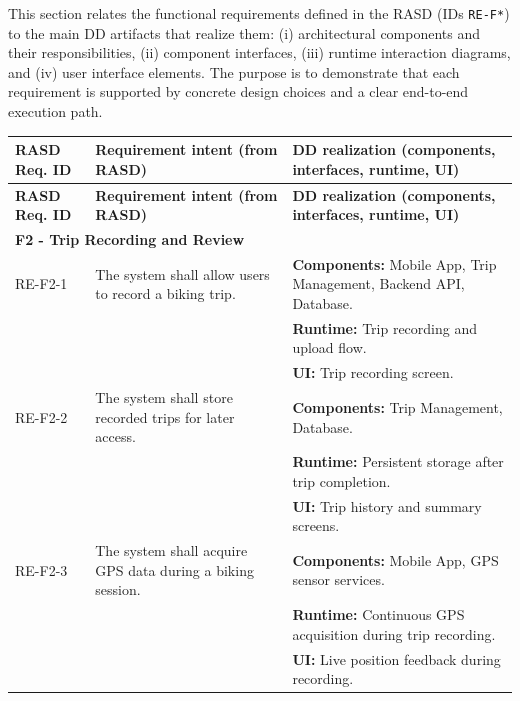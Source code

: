 
This section relates the functional requirements defined in the RASD (IDs \texttt{RE-F*})
to the main DD artifacts that realize them: (i) architectural components and their responsibilities,
(ii) component interfaces, (iii) runtime interaction diagrams, and (iv) user interface elements.
The purpose is to demonstrate that each requirement is supported by concrete design choices and
a clear end-to-end execution path.

\renewcommand{\arraystretch}{1.25}
\small
\begin{longtable}{|p{2.4cm}|p{5.2cm}|p{7cm}|}
\hline
\textbf{RASD Req. ID} & \textbf{Requirement intent (from RASD)} & \textbf{DD realization (components, interfaces, runtime, UI)} \\
\hline
\endfirsthead

\hline
\textbf{RASD Req. ID} & \textbf{Requirement intent (from RASD)} & \textbf{DD realization (components, interfaces, runtime, UI)} \\
\hline
\endhead

\multicolumn{3}{|l|}{\textbf{F2 - Trip Recording and Review}}\\
\hline
RE-F2-1 &
The system shall allow users to record a biking trip. &
\textbf{Components:} Mobile App, Trip Management, Backend API, Database.\\
& & \textbf{Runtime:} Trip recording and upload flow.\\
& & \textbf{UI:} Trip recording screen.\\
\hline

RE-F2-2 &
The system shall store recorded trips for later access. &
\textbf{Components:} Trip Management, Database.\\
& & \textbf{Runtime:} Persistent storage after trip completion.\\
& & \textbf{UI:} Trip history and summary screens.\\
\hline

RE-F2-3 &
The system shall acquire GPS data during a biking session. &
\textbf{Components:} Mobile App, GPS sensor services.\\
& & \textbf{Runtime:} Continuous GPS acquisition during trip recording.\\
& & \textbf{UI:} Live position feedback during recording.\\
\hline


\end{longtable}

